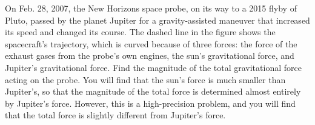 On Feb. 28, 2007, the New Horizons space probe, on its way to a 2015 flyby of Pluto,
passed by the planet Jupiter for a gravity-assisted maneuver that increased its speed
and changed its course. The dashed line in the figure shows the spacecraft's trajectory,
which is curved because of three forces: the force of the exhaust gases from the probe's
own engines, the sun's gravitational force, and Jupiter's gravitational force.
Find the magnitude of the total gravitational force acting on the probe.
You will find that the sun's force is much smaller than Jupiter's, so that the
magnitude of the total force is determined almost entirely by Jupiter's force.
However, this is a high-precision problem, and you will find that the total
force is slightly different from Jupiter's force.\answercheck
